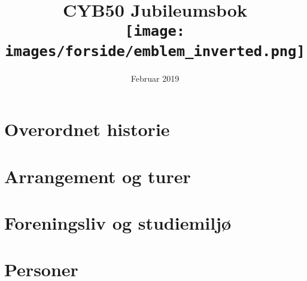 \documentclass[hidelinks, openany, 12pt, a4paper]{book}
\title{CYB50 Jubileumsbok\\ \texttt{[image: images/forside/emblem\_inverted.png]}}
\author{}
\date{Februar 2019}
\begin{document}
\maketitle



\part{Overordnet historie}













\part{Arrangement og turer}









\part{Foreningsliv og studiemiljø}








% 




\part{Personer}











\end{document}

